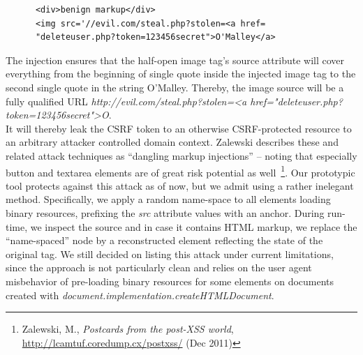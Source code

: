       \begin{verbatim}
      <div>benign markup</div>
      <img src='//evil.com/steal.php?stolen=<a href=
      "deleteuser.php?token=123456secret">O'Malley</a>
      \end{verbatim}

      The injection ensures that the half-open image tag's source attribute will cover everything from the beginning of single quote inside the injected image tag to the second single quote in the string O'Malley. Thereby, the image source will be a fully qualified URL \textit{http://evil.com/steal.php?stolen=<a href="deleteuser.php?token=123456secret">O}.\\

 It will thereby leak the CSRF token to an otherwise CSRF-protected resource to an arbitrary attacker controlled domain context. Zalewski describes these and related attack techniques as ``dangling markup injections'' -- noting that especially button and textarea elements are of great risk potential as well~\footnote{Zalewski, M., \textit{Postcards from the post-XSS world}, \url{http://lcamtuf.coredump.cx/postxss/} (Dec 2011)}. Our prototypic tool protects against this attack as of now, but we admit using a rather inelegant method. Specifically, we apply a random name-space to all elements loading binary resources, prefixing the \textit{src} attribute values with an anchor. During run-time, we inspect the source and in case it contains HTML markup, we replace the ``name-spaced'' node by a reconstructed element reflecting the state of the original tag. We still decided on listing this attack under current limitations, since the approach is not particularly clean and relies on the user agent misbehavior of pre-loading binary resources for some elements on documents created with \textit{document.implementation.createHTMLDocument}. \\

